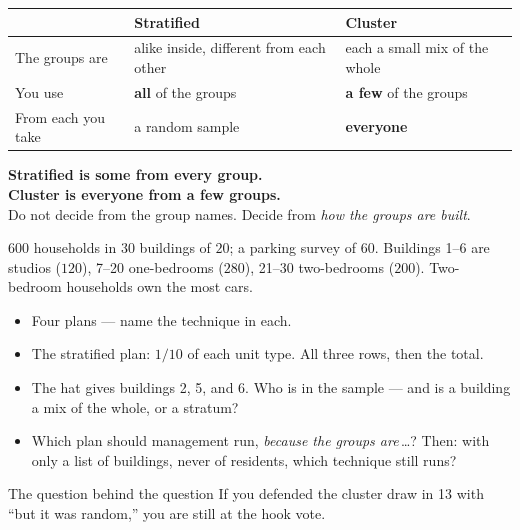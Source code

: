 \documentclass[aspectratio=169, 11pt]{beamer}
\begin{document}
\begin{frame}[t, plain]
  \vspace{0.2cm}
  \begin{center}
    \small
    \renewcommand{\arraystretch}{1.35}
    \begin{tabular}{@{} l l l @{}}
    \hline
     & \textbf{Stratified} & \textbf{Cluster} \\
    \hline
    The groups are     & alike inside, different from each other & each a small mix of the whole \\
    You use            & \textbf{all} of the groups & \textbf{a few} of the groups \\
    From each you take & a random sample & \textbf{everyone} \\
    \hline
    \end{tabular}
  \end{center}
  \vspace{0.6cm}
  \begin{center}
    {\color{cerulean}\bfseries Stratified is some from every group.\\[4pt]
     Cluster is everyone from a few groups.}\\[8pt]
    {\small\color{slate} Do not decide from the group names. Decide from \emph{how the groups
    are built}.}
  \end{center}
\end{frame}

\begin{frame}[t, plain]
  $600$ households in $30$ buildings of $20$; a parking survey of $60$. Buildings 1--6 are
  studios ($120$), 7--20 one-bedrooms ($280$), 21--30 two-bedrooms ($200$). Two-bedroom
  households own the most cars.
  \begin{itemize}\setlength{\itemsep}{4pt}
    \item[11.] Four plans --- name the technique in each.
    \item[12.] The stratified plan: $1/10$ of each unit type. All three rows, then the total.
    \item[13.] The hat gives buildings 2, 5, and 6. Who is in the sample --- and is a building a
          mix of the whole, or a stratum?
    \item[14.] Which plan should management run, \emph{because the groups are}\,\ldots? Then:
          with only a list of buildings, never of residents, which technique still runs?
  \end{itemize}
  \begin{block}{The question behind the question}
    If you defended the cluster draw in 13 with ``but it was random,'' you are still at the hook vote.
  \end{block}
\end{frame}
\end{document}
